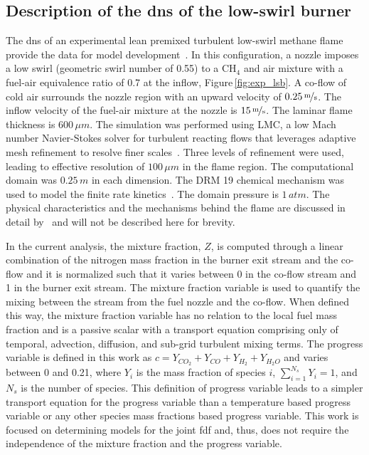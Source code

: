 \documentclass[review]{elsarticle}
\begin{document}
\subsection{Description of the \acrlong{dns} of the low-swirl burner}\label{sec:dns}
The \gls{dns} of an experimental lean premixed turbulent low-swirl
methane flame provide the data for model
development~\cite{Day2012,Cheng2000}. In this configuration, a nozzle
imposes a low swirl (geometric swirl number of 0.55) to a CH$_4$ and
air mixture with a fuel-air equivalence ratio of 0.7 at the inflow, Figure\,\ref{fig:exp_lsb}. A
co-flow of cold air surrounds the nozzle region with an upward
velocity of $0.25\,\unitfrac{m}{s}$. The inflow velocity of the
fuel-air mixture at the nozzle is $15\,\unitfrac{m}{s}$. The laminar
flame thickness is $600\,\unit{\mu m}$. The simulation was performed
using LMC, a low Mach number Navier-Stokes solver for turbulent
reacting flows that leverages adaptive mesh refinement to resolve
finer scales~\cite{Day2000}. Three levels of refinement were used,
leading to effective resolution of $100\,\unit{\mu m}$ in the flame
region. The computational domain was $0.25\,\unit{m}$ in each
dimension. The DRM 19 chemical mechanism was used to model the finite
rate kinetics~\cite{Kazakov1994}. The domain pressure is
$1\,\unit{atm}$. The physical characteristics and the mechanisms behind the flame are discussed in detail by~\citet{Day2012} and will not be described here for brevity. 

In the current analysis, the mixture fraction, $Z$, is computed
through a linear combination of the nitrogen mass fraction in the
burner exit stream and the co-flow and it is normalized such that it
varies between 0 in the co-flow stream and 1 in the burner exit
stream. The mixture fraction variable is used to quantify the mixing
between the stream from the fuel nozzle and the co-flow. When defined
this way, the mixture fraction variable has no relation to the local
fuel mass fraction and is a passive scalar with a transport equation
comprising only of temporal, advection, diffusion, and sub-grid
turbulent mixing terms. The progress variable is defined in this work
as $c= Y_{CO_2} + Y_{CO} + Y_{H_2} + Y_{H_2O}$ and varies between 0
and 0.21, where $Y_i$ is the mass fraction of species $i$,
$\sum^{N_s}_{i=1} Y_i = 1$, and $N_s$ is the number of species. This
definition of progress variable leads to a simpler transport equation
for the progress variable than a temperature based progress variable
or any other species mass fractions based progress variable. This work
is focused on determining models for the joint \gls{fdf} and, thus,
does not require the independence of the mixture fraction and the
progress variable.
\end{document}
